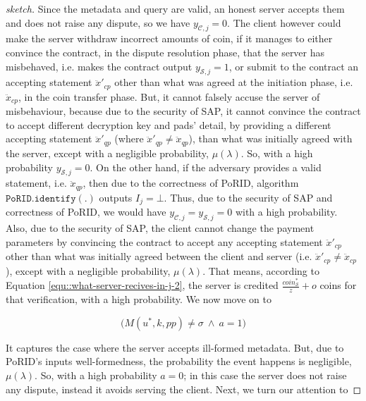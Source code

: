 \begin{proof}[sketch]
  Since the metadata and query are valid, an honest server accepts them and does not raise any dispute, so we have $y_{\scriptscriptstyle\mathcal{C},j}=0$.  The client however could  make the server  withdraw incorrect amounts of coin, if it manages to either convince the contract, in the dispute resolution phase,  that the server has misbehaved, i.e. makes the contract output $y_{\scriptscriptstyle\mathcal{S},j}=1$, or submit to the contract  an accepting  statement $\ddot{x}'_{\scriptscriptstyle cp}$ other than what was agreed at the initiation phase, i.e. $\ddot{x}_{\scriptscriptstyle cp}$, in the coin transfer phase. But, it cannot falsely accuse the server of misbehaviour, because due to the security of SAP, it cannot  convince the contract to accept different decryption key and pads' detail, by providing a different accepting statement $\ddot{x}'_{\scriptscriptstyle qp}$  (where $\ddot{x}'_{\scriptscriptstyle qp}\neq \ddot{x}_{\scriptscriptstyle qp}$), than what was initially agreed with the server, except with a negligible  probability, $\mu(\lambda)$.  So, with a high probability $y_{\scriptscriptstyle\mathcal{S},j}=0$. On the other hand, if the adversary provides a valid statement, i.e. $\ddot{x}_{\scriptscriptstyle qp}$, then due to the correctness of PoRID, algorithm $\mathtt{PoRID.identify}(.)$ outputs $I_{\scriptscriptstyle j}=\bot$. Thus, due to the security of SAP and correctness of PoRID,  we would have $y_{\scriptscriptstyle\mathcal{C},j}=y_{\scriptscriptstyle\mathcal{S},j}=0$ with a high probability.    Also,  due to the security of SAP, the client cannot change the payment parameters by convincing the contract to accept any accepting statement $\ddot{x}'_{\scriptscriptstyle cp}$ other than what was initially agreed  between the client and server (i.e. $\ddot{x}'_{\scriptscriptstyle cp}\neq \ddot{x}_{\scriptscriptstyle cp}$), except with a negligible  probability, $\mu(\lambda)$. That means, according to  Equation \ref{equ::what-server-recives-in-j-2}, the server is credited $\frac{coin_{\scriptscriptstyle\mathcal S}^{\scriptscriptstyle*}}{z}+o$ coins for that verification, with a  high probability.  We now move on  to 
  
  $$\Big(M(u^{\scriptscriptstyle *},k,{pp})\neq \sigma\ \wedge \ a=1\Big)$$
     
     
    It captures the case where the server accepts  ill-formed metadata. But, due to PoRID's inputs well-formedness, the probability the event happens is negligible,  $\mu(\lambda)$. So, with a high probability $a=0$; in this case  the server does not raise any dispute, instead it avoids serving the client.    Next, we turn our attention   to 
     

\end{proof}
